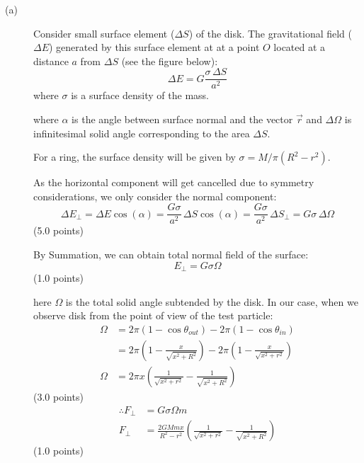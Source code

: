 \begin{description}
\item[(a)] Consider small surface element ($\Delta S$) of the disk. The
  gravitational field ($\Delta E$) generated by this surface element at at a
  point $O$ located at a distance $a$ from $\Delta S$ (see the figure below): %
  \[
    \Delta E = G\frac{\sigma\,\Delta S}{a^2}
  \]
  where $\sigma$ is a surface density of the mass.


  where $\alpha$ is the angle between surface normal and the vector $\vec r$
  and $\Delta\Omega$ is infinitesimal solid angle corresponding to the area
  $\Delta S$.

  For a ring, the surface density will be given by
  $\sigma = M/\pi(R^2 - r^2)$.

  As the horizontal component will get cancelled due to symmetry
  considerations, we only consider the normal component:
  \[
    \Delta E_\perp = \Delta E\cos(\alpha)
      = \frac{G\sigma}{a^2}\,\Delta S\cos(\alpha)
      = \frac{G\sigma}{a^2}\,\Delta S_\perp
      = G\sigma\,\Delta\Omega
  \]
  \hfill(5.0 points)

  By Summation, we can obtain total normal field of the surface:
  \[
    E_\perp = G\sigma\Omega
  \]
  \hfill(1.0 points)

  here $\Omega$ is the total solid angle subtended by the disk. In our case,
  when we observe disk from the point of view of the test particle:
  \begin{align*}
    \Omega &= 2\pi\left(1 - \cos\theta_{out}\right)
              - 2\pi\left(1 - \cos\theta_{in}\right) \\
           &= 2\pi\left(1 - \frac{x}{\sqrt{x^2 + R^2}}\right)
              - 2\pi\left(1 - \frac{x}{\sqrt{x^2 + r^2}}\right) \\
    \Omega &= 2\pi x\left(\frac{1}{\sqrt{x^2 + r^2}}
              - \frac{1}{\sqrt{x^2 + R^2}}\right)
  \end{align*}
  \hfill(3.0 points)
  \begin{align*}
    \therefore F_\perp &= G\sigma\Omega m \\
    F_\perp &= \frac{2GMmx}{R^2 - r^2}
       \left(\frac{1}{\sqrt{x^2 + r^2}} - \frac{1}{\sqrt{x^2 + R^2}}\right)
  \end{align*}
  \hfill(1.0 points)


\end{description}
